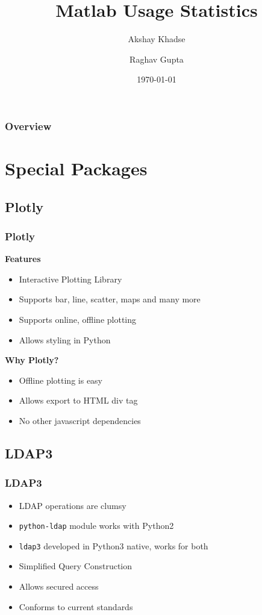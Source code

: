 \documentclass{beamer}
\title{Matlab Usage Statistics}
\author{Akshay Khadse \and Raghav Gupta}
\institute[IITB]
{Indian Institute of Technology, Bombay}
\date{\today}
\begin{document}
\begin{frame}
    \titlepage
\end{frame}

\begin{frame}
    \frametitle{Overview}
    \tableofcontents
\end{frame}


\section{Special Packages}
\subsection{Plotly}
\begin{frame}
    \frametitle{Plotly}
    \textbf{Features}
    \begin{itemize}
        \item Interactive Plotting Library
        \item Supports bar, line, scatter, maps and many more
        \item Supports online, offline plotting
        \item Allows styling in Python
    \end{itemize}
    \textbf{Why Plotly?}
    \begin{itemize}
        \item Offline plotting is easy
        \item Allows export to HTML div tag
        \item No other javascript dependencies
    \end{itemize}
\end{frame}

\subsection{LDAP3}
\begin{frame}
    \frametitle{LDAP3}
    \begin{itemize}
        \item LDAP operations are clumsy
        \item \texttt{python-ldap} module works with Python2
        \item \texttt{ldap3} developed in Python3 native, works for both
        \item Simplified Query Construction
        \item Allows secured access
        \item Conforms to current standards
    \end{itemize}
\end{frame}
\end{document}
